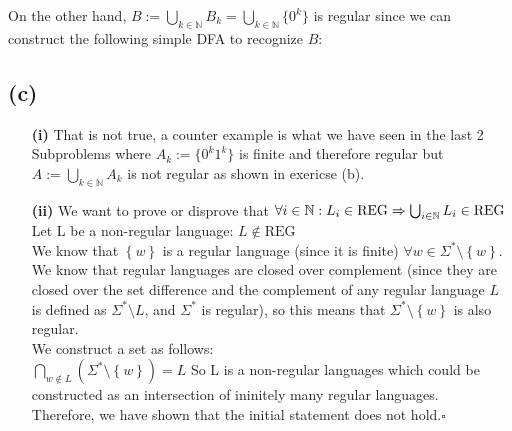 On the other hand, \( B := \bigcup_{k \in \mathbb{N}} B_k = \bigcup_{k \in \mathbb{N}} \{0^k\} \) is regular since we can construct the following simple DFA to recognize \( B \):

\begin{center}
\end{center}

\subsection{(c)}

\begin{enumerate}
    \item[\textbf{(i)}] That is not true, a counter example is what we have seen in the last 2 Subproblems where $A_k := \{0^k1^k\}$ is finite and therefore regular but \( A := \bigcup_{k \in \mathbb{N}} A_k \) is not regular as shown in exericse (b).

    \item[\textbf{(ii)}] We want to prove or disprove that $\forall i \in \mathbb{N}: L_{i} \in \text{REG} \Rightarrow \bigcup_{i\in \mathbb{N}}  L_{i} \in \text{REG}$\\
    Let L be a non-regular language: $L \notin \text{REG}$\\
    We know that $\left\{w\right\}$ is a regular language (since it is finite) $\forall w \in \Sigma^{\ast}\setminus \left\{w\right\}$.\\
    We know that regular languages are closed over complement (since they are closed over the set difference and the complement of any regular language $L$ is defined as $\Sigma^{\ast}\setminus L$, and $\Sigma^{\ast}$ is regular), so this means that $\Sigma^{\ast}\setminus \left\{w\right\}$ is also regular.\\
    We construct a set as follows:\\
    $\bigcap_{w\notin L}(\Sigma^{\ast}\setminus\left\{w\right\}) = L$
    So L is a non-regular languages which could be constructed as an intersection of ininitely many regular languages.\\
    Therefore, we have shown that the initial statement does not hold.$\square$
\end{enumerate}



